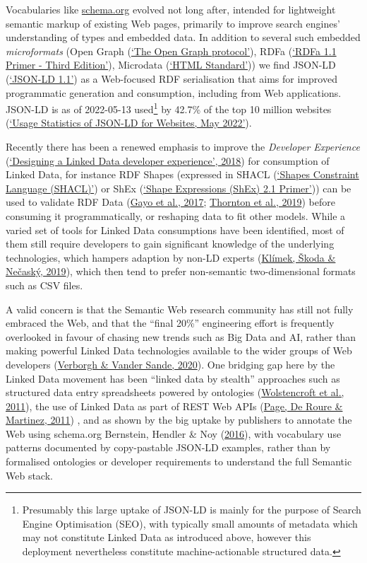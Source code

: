 Vocabularies like \href{https://schema.org/}{schema.org} evolved not long after, intended for lightweight semantic markup of existing Web pages, primarily to improve search engines' understanding of types and embedded data. In addition to several such embedded \emph{microformats} (Open Graph (\protect\hyperlink{ref-oN9D5LkD}{{`The Open Graph protocol'}}), RDFa (\protect\hyperlink{ref-FKIF6ApB}{{`RDFa 1.1 Primer - Third Edition'}}), Microdata (\protect\hyperlink{ref-14Utscfe4}{{`HTML Standard'}})) we find JSON-LD (\protect\hyperlink{ref-X5SWPqSU}{{`JSON-LD 1.1'}}) as a Web-focused RDF serialisation that aims for improved programmatic generation and consumption, including from Web applications. JSON-LD is as of 2022-05-13 used\footnote{Presumably this large uptake of JSON-LD is mainly for the purpose of Search Engine Optimisation (SEO), with typically small amounts of metadata which may not constitute Linked Data as introduced above, however this deployment nevertheless constitute machine-actionable structured data.} by 42.7\% of the top 10 million websites (\protect\hyperlink{ref-j3SqQLBR}{{`Usage Statistics of JSON-LD for Websites, May 2022'}}).

Recently there has been a renewed emphasis to improve the \emph{Developer Experience} (\protect\hyperlink{ref-BFMoe8FC}{{`Designing a Linked Data developer experience'}, 2018}) for consumption of Linked Data, for instance RDF Shapes (expressed in SHACL (\protect\hyperlink{ref-GDrm9dgX}{{`Shapes Constraint Language (SHACL)'}}) or ShEx (\protect\hyperlink{ref-YUzogaV}{{`Shape Expressions (ShEx) 2.1 Primer'}})) can be used to validate RDF Data (\protect\hyperlink{ref-ZeOAPNHa}{Gayo et al., 2017}; \protect\hyperlink{ref-S5BI6Mwx}{Thornton et al., 2019}) before consuming it programmatically, or reshaping data to fit other models. While a varied set of tools for Linked Data consumptions have been identified, most of them still require developers to gain significant knowledge of the underlying technologies, which hampers adaption by non-LD experts (\protect\hyperlink{ref-o596f2JM}{Klímek, Škoda \& Nečaský, 2019}), which then tend to prefer non-semantic two-dimensional formats such as CSV files.

A valid concern is that the Semantic Web research community has still not fully embraced the Web, and that the ``final 20\%'' engineering effort is frequently overlooked in favour of chasing new trends such as Big Data and AI, rather than making powerful Linked Data technologies available to the wider groups of Web developers (\protect\hyperlink{ref-jHwttlTs}{Verborgh \& Vander Sande, 2020}). One bridging gap here by the Linked Data movement has been ``linked data by stealth'' approaches such as structured data entry spreadsheets powered by ontologies (\protect\hyperlink{ref-MhsCt4P3}{Wolstencroft et al., 2011}), the use of Linked Data as part of REST Web APIs (\protect\hyperlink{ref-eS6a6tlz}{Page, De Roure \& Martinez, 2011}) , and as shown by the big uptake by publishers to annotate the Web using schema.org Bernstein, Hendler \& Noy (\protect\hyperlink{ref-117tX9MEG}{2016}), with vocabulary use patterns documented by copy-pastable JSON-LD examples, rather than by formalised ontologies or developer requirements to understand the full Semantic Web stack.

